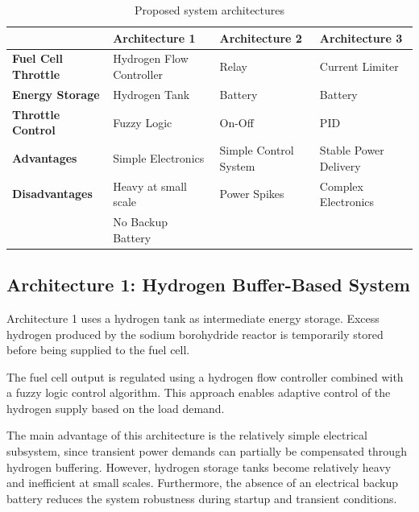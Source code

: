 \begin{table}[htp]
    \begin{tabularx}{\textwidth}{l>{\centering\arraybackslash}X>{\centering\arraybackslash}X>{\centering\arraybackslash}X}
        \toprule
                                    & \textbf{Architecture 1}  & \textbf{Architecture 2} & \textbf{Architecture 3} \\
        \midrule
        \textbf{Fuel Cell Throttle} & Hydrogen Flow Controller & Relay                   & Current Limiter         \\
        \textbf{Energy Storage}     & Hydrogen Tank            & Battery                 & Battery                 \\
        \textbf{Throttle Control}   & Fuzzy Logic              & On-Off                  & PID                     \\
        \midrule
        \textbf{Advantages}         & Simple Electronics       & Simple Control System   & Stable Power Delivery   \\
        \textbf{Disadvantages}      & Heavy at small scale     & Power Spikes            & Complex Electronics     \\
                                    & No Backup Battery        &                         &                         \\
        \bottomrule
    \end{tabularx}
    \caption{Proposed system architectures}
    \label{tab:architectures}
\end{table}

\subsection*{Architecture 1: Hydrogen Buffer-Based System}

Architecture 1 uses a hydrogen tank as intermediate energy storage. Excess hydrogen produced by the sodium borohydride reactor is temporarily stored before being supplied to the fuel cell.

The fuel cell output is regulated using a hydrogen flow controller combined with a fuzzy logic control algorithm. This approach enables adaptive control of the hydrogen supply based on the load demand.

The main advantage of this architecture is the relatively simple electrical subsystem, since transient power demands can partially be compensated through hydrogen buffering. However, hydrogen storage tanks become relatively heavy and inefficient at small scales. Furthermore, the absence of an electrical backup battery reduces the system robustness during startup and transient conditions.

